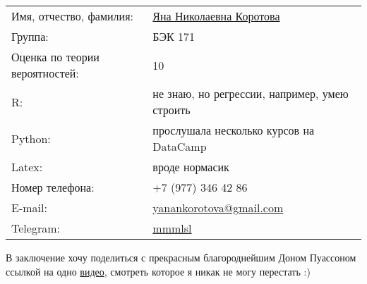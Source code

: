 \documentclass[a4paper, 12pt]{scrreprt}
\providecommand*\email[1]{\href{mailto:#1}{#1}}
\begin{document}
\begin{center}
    \begin{tabular}{ll}
        \hline
        \hline
        Имя, отчество, фамилия: & \href{https://vk.com/mmmlsl}{Яна Николаевна Коротова} \\
        Группа: & БЭК 171 \\
        Оценка по теории вероятностей: & 10 \\
        \hline
        R: & не знаю, но регрессии, например, умею строить \\
        Python: & прослушала несколько курсов на DataCamp \\
        Latex: & вроде нормасик \\
        \hline
        Номер телефона: & +7 (977) 346 42 86 \\
        E-mail: & \email{yanankorotova@gmail.com} \\
        Telegram: & \href{https://t.me/mmmlsl}{mmmlsl} \\
        \hline
        \hline
    \end{tabular}
\end{center}

В заключение хочу поделиться с прекрасным благороднейшим Доном Пуассоном ссылкой на одно \href{https://rutube.ru/video/12d4c39005a0f29901c25aa28122db3c/}{видео}, смотреть которое я никак не могу перестать :)
\end{document}
